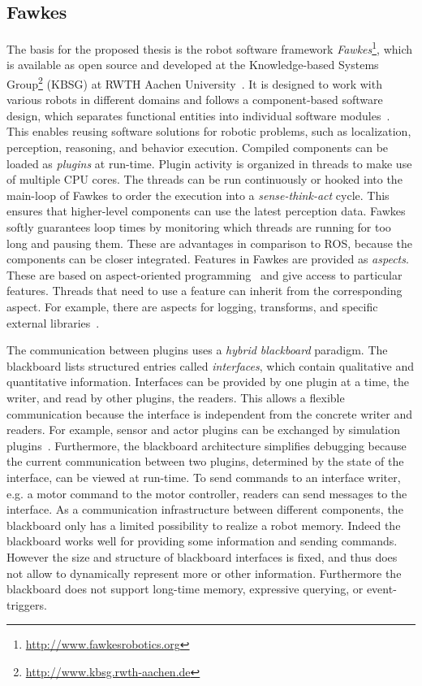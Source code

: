\subsection{Fawkes}
\label{sec:fawkes}
The basis for the proposed thesis is the robot software framework
\emph{Fawkes}\footnote{\url{http://www.fawkesrobotics.org}}, which is
available as open source and developed at the Knowledge-based Systems
Group\footnote{\url{http://www.kbsg.rwth-aachen.de}} (KBSG) at RWTH
Aachen University~\cite{FawkesDesign,Fawkes-RCLL-2014}.  It is
designed to work with various robots in different domains and follows
a component-based software design, which separates functional entities
into individual software modules~\cite{component}. This enables
reusing software solutions for robotic problems, such as localization,
perception, reasoning, and behavior execution. Compiled components can
be loaded as \emph{plugins} at run-time.
%
Plugin activity is organized in threads to make use of multiple CPU
cores. The threads can be run continuously or hooked into the
main-loop of Fawkes to order the execution into a
\emph{sense-think-act} cycle.  This ensures that higher-level
components can use the latest perception data.  Fawkes softly
guarantees loop times by monitoring which threads are running for too
long and pausing them. These are advantages in comparison to ROS,
because the components can be closer integrated. Features in Fawkes
are provided as \emph{aspects}. These are based on aspect-oriented
programming~\cite{aspect_oriented} and give access to particular
features. Threads that need to use a feature can inherit from the
corresponding aspect. For example, there are aspects for logging,
transforms, and specific external libraries~\cite{tnthesis}.

The communication between plugins uses a \emph{hybrid blackboard}
paradigm. The blackboard lists structured entries called
\emph{interfaces}, which contain qualitative and quantitative
information.  Interfaces can be provided by one plugin at a time, the
writer, and read by other plugins, the readers. This allows a flexible
communication because the interface is independent from the concrete
writer and readers.  For example, sensor and actor plugins can be
exchanged by simulation plugins~\cite{Gazsim-Thesis,LLSF-Sim}.
Furthermore, the blackboard architecture simplifies
debugging because the current communication between two plugins,
determined by the state of the interface, can be viewed at
run-time. To send commands to an interface writer, e.g. a motor
command to the motor controller, readers can send messages to the
interface.
As a communication infrastructure between different components, the
blackboard only has a limited possibility to realize a robot memory.
Indeed the blackboard works well for providing some information and sending
commands. However the size
and structure of blackboard interfaces is fixed, and thus does not
allow to dynamically represent more or other information.  Furthermore
the blackboard does not support long-time memory, expressive querying,
or event-triggers.

